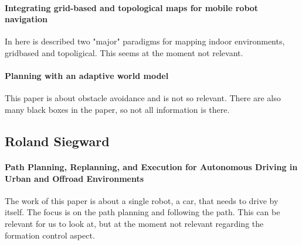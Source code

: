 {\vskip0pt\color{gray}
\paragraph{Integrating grid-based and topological maps for mobile robot navigation}
In here is described two "major" paradigms for mapping indoor environments, gridbased and topoligical. This seems at the moment not relevant.}

{\vskip0pt\color{gray}
\paragraph{Planning with an adaptive world model}
This paper is about obstacle avoidance and is not so relevant. There are also many black boxes in the paper, so not all information is there.}


\subsection{Roland Siegward}

\paragraph{Path Planning, Replanning, and Execution for Autonomous Driving in Urban and Offroad Environments}
The work of this paper is about a single robot, a car, that needs to drive by itself. The focus is on the path planning and following the path. This can be relevant for us to look at, but at the moment not relevant regarding the formation control aspect.
